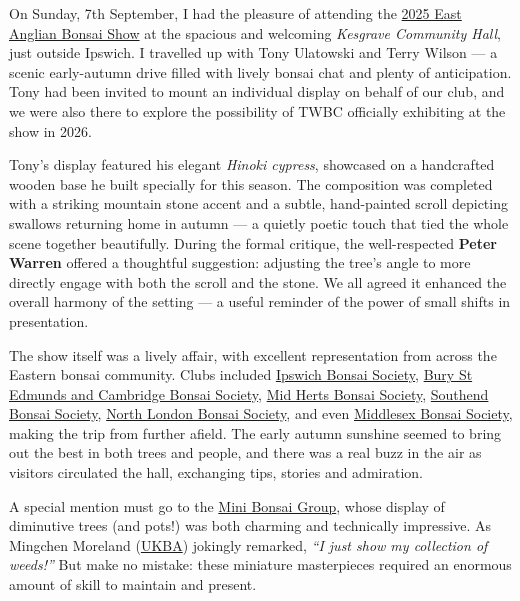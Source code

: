 \label{2025-09-show}
\noindent
On Sunday, 7th September, I had the pleasure of attending the \href{https://www.facebook.com/events/kesgrave-community-and-conference-centre/east-anglian-bonsai-show/1114446650591572/}{2025 East Anglian Bonsai Show} at the spacious and welcoming \textit{Kesgrave Community Hall}, just outside Ipswich.
I travelled up with  Tony Ulatowski and Terry Wilson --- a scenic early\--autumn drive filled with lively bonsai chat and plenty of anticipation.
Tony had been invited to mount an individual display on behalf of our club, and we were also there to explore the possibility of TWBC officially exhibiting at the show in 2026.

\medskip
Tony's display featured his elegant \textit{Hinoki cypress}, showcased on a handcrafted wooden base he built specially for this season.
The composition was completed with a striking mountain stone accent and a subtle, hand\--painted scroll depicting swallows returning home in autumn --- a quietly poetic touch that tied the whole scene together beautifully.
During the formal critique, the well\--respected \textbf{Peter Warren} offered a thoughtful suggestion: adjusting the tree's angle to more directly engage with both the scroll and the stone.
We all agreed it enhanced the overall harmony of the setting --- a useful reminder of the power of small shifts in presentation.

\medskip
The show itself was a lively affair, with excellent representation from across the Eastern bonsai community. Clubs included \href{https://www.ipswichbonsaisociety.co.uk}{Ipswich Bonsai Society}, \href{http://www.bonsaibseandc.co.uk}{Bury St Edmunds and Cambridge Bonsai Society}, \href{http://www.midhertsbonsaiclub.co.uk}{Mid Herts Bonsai Society}, \href{https://bonsaisoc.pages.dev}{Southend Bonsai Society}, \href{https://www.facebook.com/p/North-London-Bonsai-Group-100042555836132/}{North London Bonsai Society}, and even \href{https://middlesexbonsaisociety.weebly.com}{Middlesex Bonsai Society}, making the trip from further afield.
The early autumn sunshine seemed to bring out the best in both trees and people, and there was a real buzz in the air as visitors circulated the hall, exchanging tips, stories and admiration.

\medskip
A special mention must go to the \href{https://ukminibonsaigroup.weebly.com}{Mini Bonsai Group}, whose display of diminutive trees (and pots!) was both charming and technically impressive.
As Mingchen Moreland (\href{https://www.ukbonsaiassoc.org}{UKBA}) jokingly remarked, \textit{``I just show my collection of weeds!''}
But make no mistake: these miniature masterpieces required an enormous amount of skill to maintain and present.

